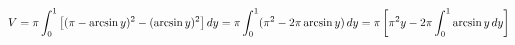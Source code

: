 \documentclass[preview]{standalone}
\begin{document}
\begin{align*}
\special{dvisvgm:raw <g id='unique000'>}V=\pi\displaystyle\int_0^1\left[(\pi-\arcsin y)^2-(\arcsin y)^2\right]dy=\pi\int_0^1(\pi^2-2\pi\arcsin y)\,dy=\pi\left[\pi^2y-2\pi\int_0^1\arcsin y\,dy\right]\special{dvisvgm:raw </g>}
\end{align*}
\end{document}

